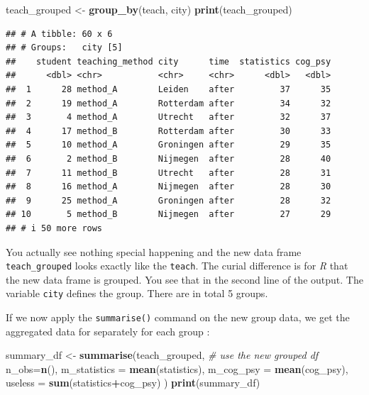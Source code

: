 \documentclass[
]{scrartcl}
\newenvironment{Shaded}{\begin{snugshade}}{\end{snugshade}}
\newcommand{\AttributeTok}[1]{\textcolor[rgb]{0.13,0.29,0.53}{#1}}
\newcommand{\CommentTok}[1]{\textcolor[rgb]{0.56,0.35,0.01}{\textit{#1}}}
\newcommand{\FunctionTok}[1]{\textcolor[rgb]{0.13,0.29,0.53}{\textbf{#1}}}
\newcommand{\NormalTok}[1]{#1}
\newcommand{\OtherTok}[1]{\textcolor[rgb]{0.56,0.35,0.01}{#1}}
\newcommand{\SpecialCharTok}[1]{\textcolor[rgb]{0.81,0.36,0.00}{\textbf{#1}}}
\begin{document}
\begin{Shaded}
\begin{Highlighting}[]
\NormalTok{teach\_grouped }\OtherTok{\textless{}{-}} \FunctionTok{group\_by}\NormalTok{(teach, city)}
\FunctionTok{print}\NormalTok{(teach\_grouped)}
\end{Highlighting}
\end{Shaded}

\begin{verbatim}
## # A tibble: 60 x 6
## # Groups:   city [5]
##    student teaching_method city      time  statistics cog_psy
##      <dbl> <chr>           <chr>     <chr>      <dbl>   <dbl>
##  1      28 method_A        Leiden    after         37      35
##  2      19 method_A        Rotterdam after         34      32
##  3       4 method_A        Utrecht   after         32      37
##  4      17 method_B        Rotterdam after         30      33
##  5      10 method_A        Groningen after         29      35
##  6       2 method_B        Nijmegen  after         28      40
##  7      11 method_B        Utrecht   after         28      31
##  8      16 method_A        Nijmegen  after         28      30
##  9      25 method_A        Groningen after         28      32
## 10       5 method_B        Nijmegen  after         27      29
## # i 50 more rows
\end{verbatim}

You actually see nothing special happening and the new data frame \texttt{teach\_grouped} looks exactly like the \texttt{teach}. The curial difference is for \emph{R} that the new data frame is grouped. You see that in the second line of the output. The variable \texttt{city} defines the group. There are in total 5 groups.

If we now apply the \texttt{summarise()} command on the new group data, we get the aggregated data for separately for each group :

\begin{Shaded}
\begin{Highlighting}[]
\NormalTok{summary\_df }\OtherTok{\textless{}{-}} \FunctionTok{summarise}\NormalTok{(teach\_grouped,   }\CommentTok{\# use the new grouped df}
                \AttributeTok{n\_obs=}\FunctionTok{n}\NormalTok{(),}
                \AttributeTok{m\_statistics =} \FunctionTok{mean}\NormalTok{(statistics),}
                \AttributeTok{m\_cog\_psy =} \FunctionTok{mean}\NormalTok{(cog\_psy),}
                \AttributeTok{useless =} \FunctionTok{sum}\NormalTok{(statistics}\SpecialCharTok{+}\NormalTok{cog\_psy) )}
\FunctionTok{print}\NormalTok{(summary\_df)}
\end{Highlighting}
\end{Shaded}
\end{document}
